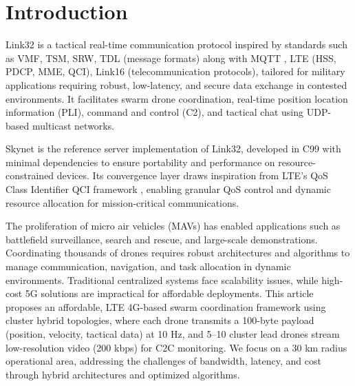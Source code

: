 \documentclass{article}
\begin{document}
\newpage
\section{Introduction}
Link32 is a tactical real-time communication protocol inspired by standards such as
VMF, TSM, SRW, TDL \cite{tdl} (message formats) along with MQTT \cite{mqtt5},
LTE (HSS, PDCP, MME, QCI), Link16 \cite{link16std} (telecommunication protocols),
tailored for military applications requiring robust, low-latency, and secure data
exchange in contested environments. It facilitates swarm drone coordination,
real-time position location information (PLI), command and control (C2),
and tactical chat using UDP-based multicast networks.

Skynet is the reference server implementation of Link32, developed in C99 with minimal dependencies
to ensure portability and performance on resource-constrained devices. Its convergence layer draws
inspiration from LTE’s QoS Class Identifier QCI framework \cite{3gpp}, enabling granular QoS control and
dynamic resource allocation for mission-critical communications.

The proliferation of micro air vehicles (MAVs) has enabled applications
such as battlefield surveillance, search and rescue, and large-scale demonstrations.
Coordinating thousands of drones requires robust architectures and algorithms to
manage communication, navigation, and task allocation in dynamic environments.
Traditional centralized systems face scalability issues, while high-cost 5G
solutions are impractical for affordable deployments. This article proposes
an affordable, LTE 4G-based swarm coordination framework using cluster hybrid
topologies, where each drone transmits a 100-byte payload (position, velocity,
tactical data) at 10 Hz, and 5--10 cluster lead drones stream low-resolution
video (200 kbps) for C2C monitoring. We focus on a 30 km radius operational
area, addressing the challenges of bandwidth, latency, and cost through
hybrid architectures and optimized algorithms.
\end{document}
